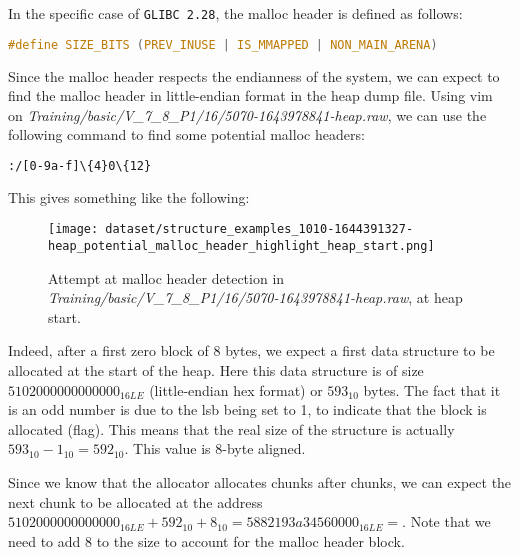     In the specific case of \texttt{GLIBC 2.28}, the malloc header is defined as follows:

    \begin{minipage}{\dimexpr\linewidth-20pt}
        \begin{lstlisting}[language=c, caption={Malloc header definition in \texttt{GLIBC 2.28}}]
            #define SIZE_BITS (PREV_INUSE | IS_MMAPPED | NON_MAIN_ARENA)
        \end{lstlisting}
    \end{minipage}
    
    Since the malloc header respects the endianness of the system, we can expect to find the malloc header in little-endian format in the heap dump file. Using vim on \textit{Training/basic/V\_7\_8\_P1/16/5070-1643978841-heap.raw}, we can use the following command to find some potential malloc headers:

    \begin{lstlisting}[language=bash, caption={Vim command to find potential malloc headers}]
        :/[0-9a-f]\{4}0\{12}
    \end{lstlisting}
    
    This gives something like the following:

    \begin{figure}[H]
        \centering
        \texttt{[image: dataset/structure\_examples\_1010-1644391327-heap\_potential\_malloc\_header\_highlight\_heap\_start.png]}
        \caption{Attempt at malloc header detection in \textit{Training/basic/V\_7\_8\_P1/16/5070-1643978841-heap.raw}, at heap start.}
    \end{figure}

    Indeed, after a first zero block of 8 bytes, we expect a first data structure to be allocated at the start of the heap. Here this data structure is of size $ 5102000000000000_{16LE} $ (little-endian hex format) or $ 593_{10} $ bytes. The fact that it is an odd number is due to the \acrshort{lsb} being set to 1, to indicate that the block is allocated (flag). This means that the real size of the structure is actually $ 593_{10} - 1_{10} = 592_{10} $. This value is 8-byte aligned.

    Since we know that the allocator allocates chunks after chunks, we can expect the next chunk to be allocated at the address $ 5102000000000000_{16LE} + 592_{10} + 8_{10} = 5882193a34560000_{16LE} =  $. Note that we need to add 8 to the size to account for the malloc header block.
    
